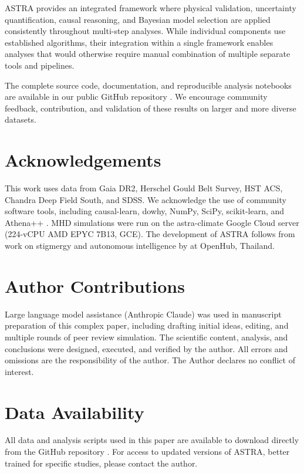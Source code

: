 \documentclass[usenatbib]{rasti}
\begin{document}
ASTRA provides an integrated framework where physical validation, uncertainty quantification, causal reasoning, and Bayesian model selection are applied consistently throughout multi-step analyses. While individual components use established algorithms, their integration within a single framework enables analyses that would otherwise require manual combination of multiple separate tools and pipelines.

The complete source code, documentation, and reproducible analysis notebooks are available in our public GitHub repository \citep{astra_github}. We encourage community feedback, contribution, and validation of these results on larger and more diverse datasets.

\section*{Acknowledgements}

This work uses data from Gaia DR2, Herschel Gould Belt Survey, HST ACS, Chandra Deep Field South, and SDSS. We acknowledge the use of community software tools, including causal-learn, dowhy, NumPy, SciPy, scikit-learn, and Athena++ \citep{stone2020}. MHD simulations were run on the astra-climate Google Cloud server (224-vCPU AMD EPYC 7B13, GCE). The development of ASTRA follows from work on stigmergy and autonomous intelligence by \citet{dey2025} at OpenHub, Thailand.

\section*{Author Contributions}

Large language model assistance (Anthropic Claude) was used in manuscript preparation of this complex paper, including drafting initial ideas, editing, and multiple rounds of peer review simulation. The scientific content, analysis, and conclusions were designed, executed, and verified by the author. All errors and omissions are the responsibility of the author. The Author declares no conflict of interest.

\section*{Data Availability}

All data and analysis scripts used in this paper are available to download directly from the GitHub repository \citep{astra_github}. For access to updated versions of ASTRA, better trained for specific studies, please contact the author.

\label{lastpage}



\end{document}
